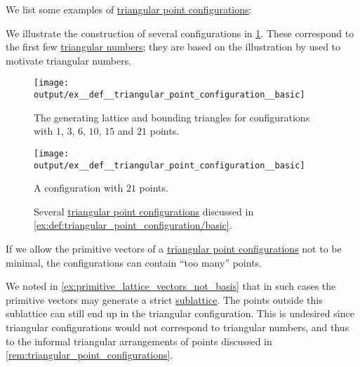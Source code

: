 \begin{example}\label{ex:def:triangular_point_configuration}
  We list some examples of \hyperref[def:triangular_point_configuration]{triangular point configurations}:

  \begin{thmenum}
     We illustrate the construction of several configurations in \cref{fig:ex:def:triangular_point_configuration/basic}. These correspond to the first few \hyperref[def:triangular_number]{triangular numbers}; they are based on the illustration by  used to motivate triangular numbers.

    \begin{figure}[!ht]
      \begin{subcaptionblock}[t]{0.45\textwidth}
        \centering
        \texttt{[image: output/ex\_\_def\_\_triangular\_point\_configuration\_\_basic]}
        \caption{The generating lattice and bounding triangles for configurations with \( 1 \), \( 3 \), \( 6 \), \( 10 \), \( 15 \) and \( 21 \) points.}\label{fig:ex:def:triangular_point_configuration/basic/triangles}
      \end{subcaptionblock}
      \hfill
      \begin{subcaptionblock}[t]{0.45\textwidth}
        \centering
        \texttt{[image: output/ex\_\_def\_\_triangular\_point\_configuration\_\_basic]}
        \caption{A configuration with \( 21 \) points.}\label{fig:ex:def:triangular_point_configuration/basic/21}
      \end{subcaptionblock}
      \caption{Several \hyperref[def:triangular_point_configuration]{triangular point configurations} discussed in \cref{ex:def:triangular_point_configuration/basic}.}\label{fig:ex:def:triangular_point_configuration/basic}
    \end{figure}

     If we allow the primitive vectors of a \hyperref[def:triangular_point_configuration]{triangular point configurations} not to be minimal, the configurations can contain \enquote{too many} points.

    We noted in \cref{ex:primitive_lattice_vectors_not_basis} that in such cases the primitive vectors may generate a strict \hyperref[def:point_sublattice]{sublattice}. The points outside this sublattice can still end up in the triangular configuration. This is undesired since triangular configurations would not correspond to triangular numbers, and thus to the informal triangular arrangements of points discussed in \cref{rem:triangular_point_configurations}.


\end{thmenum}
\end{example}
